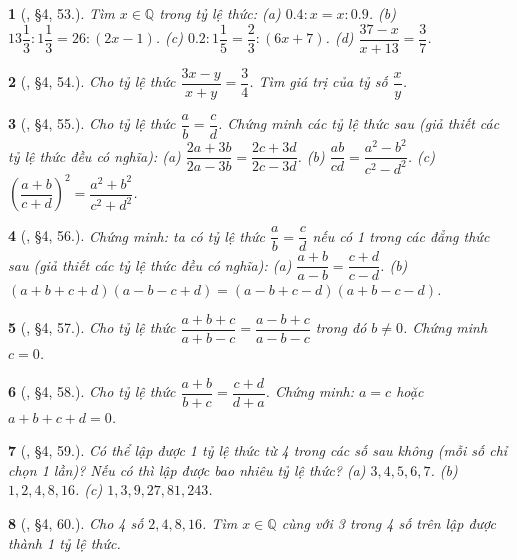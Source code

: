 \documentclass{article}
\newtheorem{baitoan}{}
\begin{document}
\begin{baitoan}[\cite{Binh_Toan_7_tap_1}, \S4, 53.]
	Tìm $x\in\mathbb{Q}$ trong tỷ lệ thức: (a) $0.4:x = x:0.9$. (b) $13\dfrac{1}{3}:1\dfrac{1}{3} = 26:(2x - 1)$. (c) $0.2:1\dfrac{1}{5} = \dfrac{2}{3}:(6x + 7)$. (d) $\dfrac{37 - x}{x + 13} = \dfrac{3}{7}$.	
\end{baitoan}

\begin{baitoan}[\cite{Binh_Toan_7_tap_1}, \S4, 54.]
	Cho tỷ lệ thức $\dfrac{3x - y}{x + y} = \dfrac{3}{4}$. Tìm giá trị của tỷ số $\dfrac{x}{y}$.
\end{baitoan}

\begin{baitoan}[\cite{Binh_Toan_7_tap_1}, \S4, 55.]
	Cho tỷ lệ thức $\dfrac{a}{b} = \dfrac{c}{d}$. Chứng minh các tỷ lệ thức sau (giả thiết các tỷ lệ thức đều có nghĩa): (a) $\dfrac{2a + 3b}{2a - 3b} = \dfrac{2c + 3d}{2c - 3d}$. (b) $\dfrac{ab}{cd} = \dfrac{a^2 - b^2}{c^2 - d^2}$. (c) $\left(\dfrac{a + b}{c + d}\right)^2 = \dfrac{a^2 + b^2}{c^2 + d^2}$.	
\end{baitoan}

\begin{baitoan}[\cite{Binh_Toan_7_tap_1}, \S4, 56.]
	Chứng minh: ta có tỷ lệ thức $\dfrac{a}{b} = \dfrac{c}{d}$ nếu có 1 trong các đẳng thức sau (giả thiết các tỷ lệ thức đều có nghĩa): (a) $\dfrac{a + b}{a - b} = \dfrac{c + d}{c - d}$. (b) $(a + b + c + d)(a - b - c + d) = (a - b + c - d)(a + b - c - d)$.	
\end{baitoan}

\begin{baitoan}[\cite{Binh_Toan_7_tap_1}, \S4, 57.]
	Cho tỷ lệ thức $\dfrac{a + b + c}{a + b - c} = \dfrac{a - b + c}{a - b - c}$ trong đó $b\ne 0$. Chứng minh $c = 0$.
\end{baitoan}

\begin{baitoan}[\cite{Binh_Toan_7_tap_1}, \S4, 58.]
	Cho tỷ lệ thức $\dfrac{a + b}{b + c} = \dfrac{c + d}{d + a}$. Chứng minh: $a = c$ hoặc $a + b + c + d = 0$.
\end{baitoan}

\begin{baitoan}[\cite{Binh_Toan_7_tap_1}, \S4, 59.]
	Có thể lập được 1 tỷ lệ thức từ 4 trong các số sau không (mỗi số chỉ chọn 1 lần)? Nếu có thì lập được bao nhiêu tỷ lệ thức? (a) $3,4,5,6,7$. (b) $1,2,4,8,16$. (c) $1,3,9,27,81,243$.	
\end{baitoan}

\begin{baitoan}[\cite{Binh_Toan_7_tap_1}, \S4, 60.]
	Cho 4 số $2,4,8,16$. Tìm $x\in\mathbb{Q}$ cùng với 3 trong 4 số trên lập được thành 1 tỷ lệ thức.
\end{baitoan}
\end{document}
